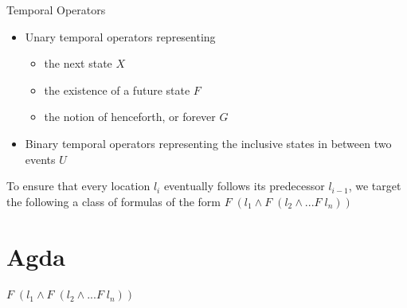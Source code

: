 \documentclass{beamer}
\begin{document}
\begin{frame}
\begin{block}{Temporal Operators}
\begin{itemize}[<+->]
\item Unary temporal operators representing
\begin{itemize}[<+->]
\item the next state $X$
\item the existence of a future state $F$
\item the notion of henceforth, or forever $G$
\end{itemize}
\item Binary temporal operators representing the inclusive states in between two events $U$
\end{itemize}
\end{block}
\pause
\begin{exampleblock}{}
To ensure that every location $l_i$ eventually follows its predecessor
$l_{i-1}$, we target the following a class of formulas of the form $F\; (l_1 \wedge F\; (l_{2} \wedge ... F\; l_{n}))$
\end{exampleblock}

\end{frame}

\section{Agda}

\begin{frame}

\end{frame}

\begin{frame}
\begin{exampleblock}{}
$F\; (l_1 \wedge F\; (l_{2} \wedge ... F\; l_{n}))$
\end{exampleblock}

\end{frame}

\begin{frame}

\end{frame}

\begin{frame}

\end{frame}

\begin{frame}

\end{frame}

\begin{frame}

\end{frame}
\end{document}
